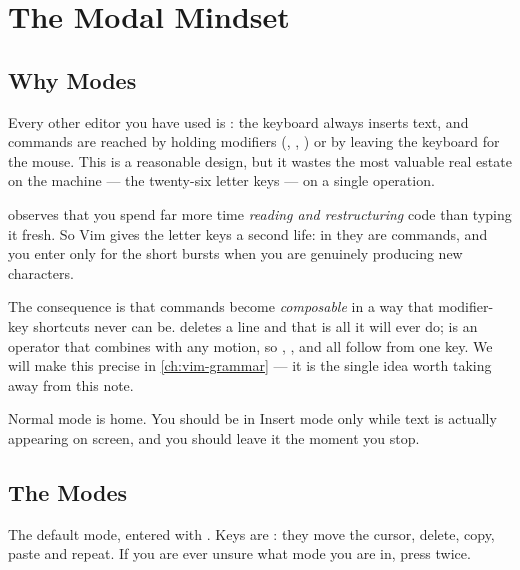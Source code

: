 \chapter{The Modal Mindset}\label{ch:vim-modal}

\section{Why Modes}\label{sec:vim-why-modal}

Every other editor you have used is : the keyboard always
inserts text, and commands are reached by holding modifiers
(, , ) or by leaving the keyboard for the
mouse. This is a reasonable design, but it wastes the most valuable real estate
on the machine --- the twenty-six letter keys --- on a single operation.

\begin{intuition}
	 observes that you spend far more time \emph{reading and
		restructuring} code than typing it fresh. So Vim gives the letter keys a
	second life: in  they are commands, and you enter
	 only for the short bursts when you are genuinely producing
	new characters.
\end{intuition}

The consequence is that commands become \emph{composable} in a way that
modifier-key shortcuts never can be.  deletes a line and that is
all it will ever do;  is an operator that combines with any motion, so
 ,  \key{\$},   \key{(} and  \key{/}
    all follow from one key. We will make this
precise in \autoref{ch:vim-grammar} --- it is the single idea worth taking away from
this note.

\begin{moral}
	Normal mode is home. You should be in Insert mode only while text is actually
	appearing on screen, and you should leave it the moment you stop.
\end{moral}

\section{The Modes}\label{sec:vim-the-modes}

\begin{definition}
	The default mode, entered with . Keys are : they
	move the cursor, delete, copy, paste and repeat. If you are ever unsure what
	mode you are in, press  twice.
\end{definition}

